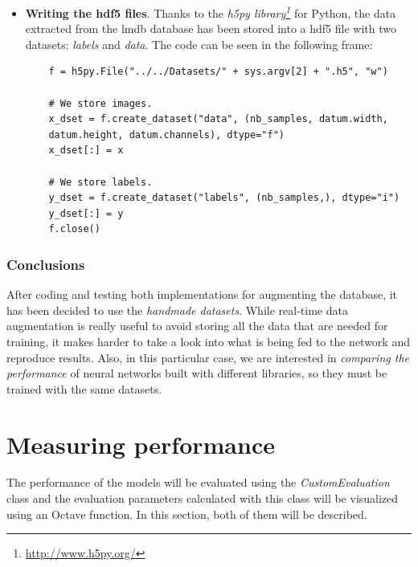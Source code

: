 \begin{itemize}
\begin{lstlisting}
		x.append(im)
		y.append(label)
		nb_samples += 1
		
		print("Extracted samples: " + str(nb_samples) + "\n")
	
	x = np.asarray(x)
	y = np.asarray(y)
\end{lstlisting}
	
	\item \textbf{Writing the \gls{hdf5} files}. Thanks to the \emph{h5py library\footnote{\url{http://www.h5py.org/}}} for Python, the data extracted from the \gls{lmdb} database has been stored into a \gls{hdf5} file with two datasets: \textit{labels} and \textit{data}. The code can be seen in the following frame:	 
	\begin{lstlisting}
	f = h5py.File("../../Datasets/" + sys.argv[2] + ".h5", "w")
	
	# We store images.
	x_dset = f.create_dataset("data", (nb_samples, datum.width,
	datum.height, datum.channels), dtype="f")
	x_dset[:] = x
	
	# We store labels.
	y_dset = f.create_dataset("labels", (nb_samples,), dtype="i")
	y_dset[:] = y
	f.close()
	\end{lstlisting}
\end{itemize} 

\subsubsection{Conclusions}
After coding and testing both implementations for augmenting the database, it has been decided to use the \emph{handmade datasets}. While real-time data augmentation is really useful to avoid storing all the data that are needed for training, it makes harder to take a look into what is being fed to the network and reproduce results. Also, in this particular case, we are interested in \emph{comparing the performance} of neural networks built with different libraries, so they must be trained with the same datasets.

\section{Measuring performance}\label{sec:measuring}
The performance of the models will be evaluated using the \textit{CustomEvaluation} class and the evaluation parameters calculated with this class will be visualized using an Octave function. In this section, both of them will be described.

